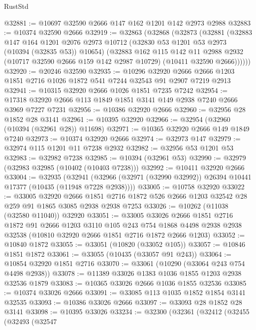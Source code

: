 \begin{lexlean}{RustStd}
\begin{coremodule}
@32881 := @10697 @32590 @2666 @147 @162 @1201 @142 @2973 @2988
@32883 := @10374 @32590 @2666
@32919 := @32863
    (@32868
      (@32873
        (@32881
          (@32883
            @147
            @164
            @1201
            @2076
            @2973
            @10712
            (@32830 @53 @1201 @53 @2973 (@10394 (@32835 @53)) @10654)
            (@32883
              @162
              @115
              @142
              @11
              @2988
              @2932
              (@10717 @32590 @2666 @159 @142 @2987 @10729)
              (@10411 @32590 @2666))))))
@32920 := @20246 @32590
@32935 := @10296
    @32920
    @2666
    @2666
    @1203
    @1851
    @2716
    @1026
    @1872
    @541
    @7244
    @32543
    @91
    @2907
    @7219
    @2913
@32941 := @10315 @32920 @2666 @1026 @1851 @7235 @7242
@32954 := @17318 @32920 @2666 @113 @1849 @1851 @3141 @149 @2938 @7240 @2666 @3969 @7227 @7231
@32956 := @10386 @32920 @2666
@32960 := @32956 @28 @1852 @28 @3141
@32961 := @10395 @32920
@32966 := @32954 (@32960 (@10394 (@32961 @28)) @11698)
@32971 := @10365 @32920 @2666 @149 @1849 @7240
@32973 := @10374 @32920 @2666
@32974 := @32973 @147
@32979 := @32974 @115 @1201 @11 @7238 @2932
@32982 := @32956 @53 @1201 @53
@32983 := @32982 @7238
@32985 := @10394 (@32961 @53)
@32990 := @32979 (@32983 @32985 (@10402 (@10403 @7238)))
@32992 := @10411 @32920 @2666
@33004 := @32935
    (@32941 (@32966 (@32971 (@32990 @32992)) @26394 @10441 @17377 (@10435 (@11948 @7228 @2938))))
@33005 := @10758 @32920
@33022 := @33005
    @32920
    @2666
    @1851
    @2716
    @1872
    @526
    @2666
    @1203
    @32542
    @28
    @259
    @91
    @1865
    @3085
    @2938
    @2938
    @7253
@33026 := @10262 (@11038 (@32580 @11040)) @32920
@33051 := @33005
    @33026
    @2666
    @1851
    @2716
    @1872
    @91
    @2666
    @1203
    @3110
    @105
    @243
    @754
    @1868
    @4498
    @2938
    @2938
    @32538
    (@10810 @32920 @2666 @1851 @2716 @1872 @2666 @1203)
@33052 := @10840 @1872
@33055 := @33051 (@10820 (@33052 @105))
@33057 := @10846 @1851 @1872
@33061 := @33055 (@10435 (@33057 @91 @243))
@33064 := @10854 @32920 @1851 @2716
@33070 := @33061 (@10290 (@33064 @243 @754 @4498 @2938))
@33078 := @11389 @33026 @1383 @1036 @1855 @1203 @2938 @32536 @1879
@33083 := @10365 @33026 @2666 @1036 @1855 @32536
@33085 := @10374 @33026 @2666
@33091 := @33085 @113 @1035 @1852 @1854 @3141 @32535
@33093 := @10386 @33026 @2666
@33097 := @33093 @28 @1852 @28 @3141
@33098 := @10395 @33026
@33234 := @32300
    (@32361
      (@32412
        (@32455
          (@32493
            (@32547

\end{coremodule}
\end{lexlean}
